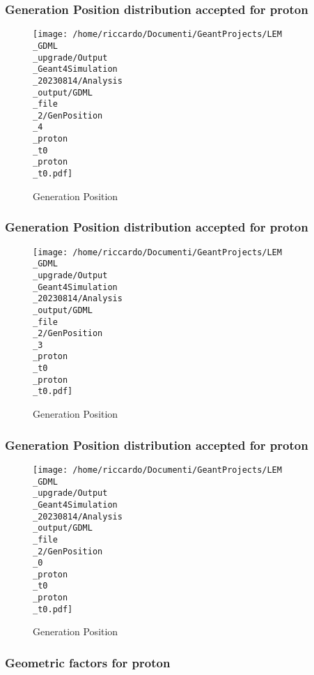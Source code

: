 \documentclass[8pt]{beamer}
\begin{document}
            \begin{frame}
                \frametitle{Generation Position distribution accepted for proton}
            
        \begin{figure}[h]
            \centering
            \texttt{[image: /home/riccardo/Documenti/GeantProjects/LEM\\\_GDML\\\_upgrade/Output\\\_Geant4Simulation\\\_20230814/Analysis\\\_output/GDML\\\_file\\\_2/GenPosition\\\_4\\\_proton\\\_t0\\\_proton\\\_t0.pdf]}
            \caption{Generation Position}
        \end{figure}
        
            \end{frame}
            
            \begin{frame}
                \frametitle{Generation Position distribution accepted for proton}
            
        \begin{figure}[h]
            \centering
            \texttt{[image: /home/riccardo/Documenti/GeantProjects/LEM\\\_GDML\\\_upgrade/Output\\\_Geant4Simulation\\\_20230814/Analysis\\\_output/GDML\\\_file\\\_2/GenPosition\\\_3\\\_proton\\\_t0\\\_proton\\\_t0.pdf]}
            \caption{Generation Position}
        \end{figure}
        
            \end{frame}
            
            \begin{frame}
                \frametitle{Generation Position distribution accepted for proton}
            
        \begin{figure}[h]
            \centering
            \texttt{[image: /home/riccardo/Documenti/GeantProjects/LEM\\\_GDML\\\_upgrade/Output\\\_Geant4Simulation\\\_20230814/Analysis\\\_output/GDML\\\_file\\\_2/GenPosition\\\_0\\\_proton\\\_t0\\\_proton\\\_t0.pdf]}
            \caption{Generation Position}
        \end{figure}
        
            \end{frame}
            
            \begin{frame}
                \frametitle{Geometric factors for proton}
            
            \end{frame}
            
\end{document}
